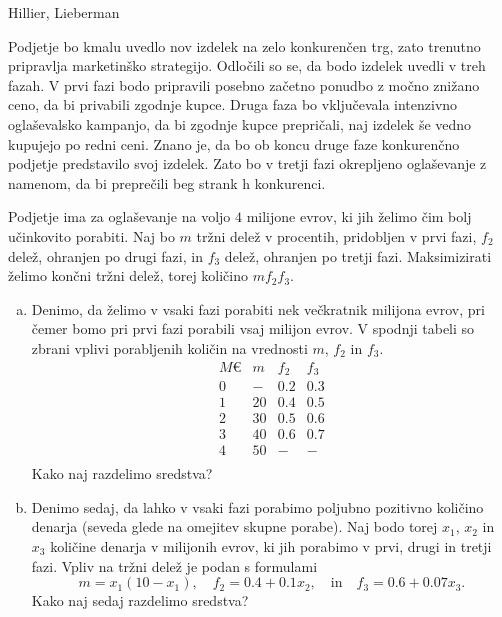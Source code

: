 \begin{naloga}{Hillier, Lieberman}{\cite[Problem~11.3-8]{hl}}
\begin{vprasanje}
Podjetje bo kmalu uvedlo nov izdelek na zelo konkurenčen trg,
zato trenutno pripravlja marketinško strategijo.
Odločili so se, da bodo izdelek uvedli v treh fazah.
V prvi fazi bodo pripravili posebno začetno ponudbo z močno znižano ceno,
da bi privabili zgodnje kupce.
Druga faza bo vključevala intenzivno oglaševalsko kampanjo,
da bi zgodnje kupce prepričali, naj izdelek še vedno kupujejo po redni ceni.
Znano je, da bo ob koncu druge faze
konkurenčno podjetje predstavilo svoj izdelek.
Zato bo v tretji fazi okrepljeno oglaševanje z namenom,
da bi preprečili beg strank h konkurenci.

Podjetje ima za oglaševanje na voljo $4$ milijone evrov,
ki jih želimo čim bolj učinkovito porabiti.
Naj bo $m$ tržni delež v procentih, pridobljen v prvi fazi,
$f_2$ delež, ohranjen po drugi fazi,
in $f_3$ delež, ohranjen po tretji fazi.
Maksimizirati želimo končni tržni delež, torej količino $m f_2 f_3$.

\begin{enumerate}[(a)]
\item Denimo, da želimo v vsaki fazi porabiti nek večkratnik milijona evrov,
pri čemer bomo pri prvi fazi porabili vsaj milijon evrov.
V spodnji tabeli so zbrani vplivi porabljenih količin
na vrednosti $m$, $f_2$ in $f_3$.
$$
\begin{array}{c|ccc}
M€ & m & f_2 & f_3 \\
\hline
0 &  - & 0.2 & 0.3 \\
1 & 20 & 0.4 & 0.5 \\
2 & 30 & 0.5 & 0.6 \\
3 & 40 & 0.6 & 0.7 \\
4 & 50 &   - &   - \\
\end{array}
$$
Kako naj razdelimo sredstva?
\item Denimo sedaj,
da lahko v vsaki fazi porabimo poljubno pozitivno količino denarja
(seveda glede na omejitev skupne porabe).
Naj bodo torej $x_1$, $x_2$ in $x_3$ količine denarja v milijonih evrov,
ki jih porabimo v prvi, drugi in tretji fazi.
Vpliv na tržni delež je podan s formulami
$$
m = x_1 (10 - x_1), \quad
f_2 = 0.4 + 0.1 x_2, \quad \text{in} \quad
f_3 = 0.6 + 0.07 x_3 .
$$
Kako naj sedaj razdelimo sredstva?
\end{enumerate}

\end{vprasanje}
\begin{odgovor}
\end{odgovor}
\end{naloga}


